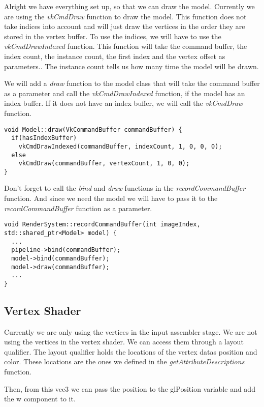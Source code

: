 \documentclass[12pt]{report} \usepackage{preamble}
\begin{document}
Alright we have everything set up, so that we can draw the model. Currently we are using the \textit{vkCmdDraw} function to draw the model.
This function does not take indices into account and will just draw the vertices in the order they are stored in the vertex buffer.
To use the indices, we will have to use the \textit{vkCmdDrawIndexed} function. This function will take
the command buffer, the index count, the instance count, the first index and the vertex offset as parameters..
The instance count tells us how many time the model will be drawn.

We will add a \textit{draw} function to the model class that will take the command buffer as a parameter and call the \textit{vkCmdDrawIndexed} function,
if the model has an index buffer. If it does not have an index buffer, we will call the \textit{vkCmdDraw} function.

\begin{lstlisting}[Language=C++]
void Model::draw(VkCommandBuffer commandBuffer) {
  if(hasIndexBuffer)
    vkCmdDrawIndexed(commandBuffer, indexCount, 1, 0, 0, 0);
  else
    vkCmdDraw(commandBuffer, vertexCount, 1, 0, 0);
}
\end{lstlisting}

Don't forget to call the \textit{bind} and \textit{draw} functions in the \textit{recordCommandBuffer} function.
And since we need the model we will have to pass it to the \textit{recordCommandBuffer} function as a parameter.

\begin{lstlisting}[Language=C++]
void RenderSystem::recordCommandBuffer(int imageIndex, std::shared_ptr<Model> model) {
  ...
  pipeline->bind(commandBuffer);
  model->bind(commandBuffer);
  model->draw(commandBuffer);
  ...
}
\end{lstlisting}

\subsection{Vertex Shader}

Currently we are only using the vertices in the input assembler stage. We are not using the vertices in the vertex shader.
We can access them through a layout qualifier. The layout qualifier holds the locations of the vertex datas position and color.
These locations are the ones we defined in the \textit{getAttributeDescriptions} function.

Then, from this vec3 we can pass the position to the gl\textunderscore Position variable and add the w component to it.
\end{document}
